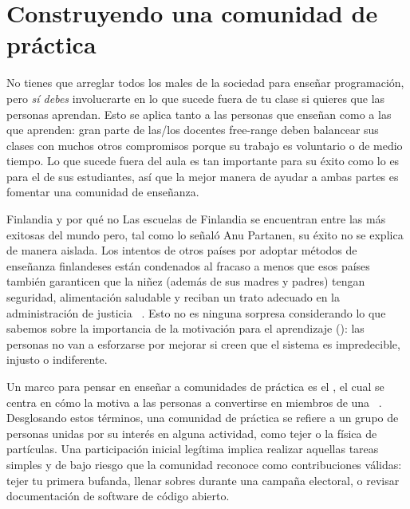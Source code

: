 \chapter{Construyendo una comunidad de práctica}\label{s:community}

No tienes que arreglar todos los males de la sociedad para enseñar programación,
pero \emph{sí debes} involucrarte en
lo que sucede fuera de tu clase si quieres que las personas aprendan.
Esto se aplica tanto a las personas que enseñan como a las que aprenden:
gran parte de las/los docentes free-range deben balancear sus clases con muchos otros compromisos
porque su trabajo es voluntario o de medio tiempo.
Lo que sucede fuera del aula es tan importante para su éxito
como lo es para el de sus estudiantes,
así que la mejor manera de ayudar a ambas partes es fomentar una comunidad de enseñanza.


\begin{aside}{Finlandia y por qué no}
Las escuelas de Finlandia se encuentran entre las más exitosas del mundo
pero, tal como lo señaló Anu Partanen,
su éxito no se explica de manera aislada.
  Los intentos de otros países por adoptar métodos de enseñanza finlandeses están condenados al fracaso
  a menos que esos países también garanticen que la niñez (además de sus madres y padres) tengan seguridad, alimentación saludable y reciban un trato adecuado en la administración de justicia ~\cite{Sahl2015, Wilk2011}.
  Esto no es ninguna sorpresa considerando lo que sabemos sobre la importancia de la motivación para el aprendizaje ():
  las personas no van a esforzarse por mejorar si creen que el sistema es impredecible, injusto o indiferente.
\end{aside}

Un marco para pensar en enseñar a comunidades de práctica es el ,
el cual se centra en cómo la 
motiva a las personas a convertirse en miembros de
una ~\cite{Weng2015}.
Desglosando estos términos,
una comunidad de práctica se refiere a  un grupo de personas unidas por su interés en alguna actividad,
como tejer o la física de partículas.
Una participación inicial legítima implica realizar aquellas tareas simples y de bajo riesgo
que la comunidad reconoce como contribuciones válidas:
tejer tu primera bufanda,
llenar sobres durante una campaña electoral,
o revisar documentación de software de código abierto.

